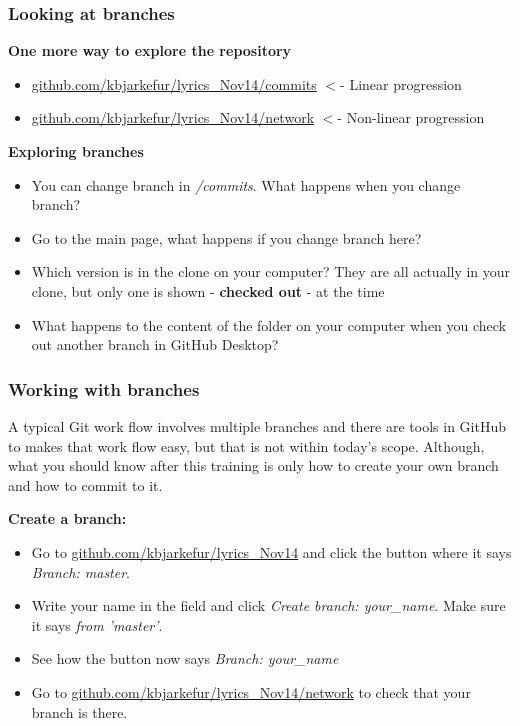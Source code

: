 \documentclass[aspectratio=169]{beamer} %
\newcommand{\trainingURL}[1]{{\color{blue}\url{#1}}}
\newcommand{\traininerUsername}{kbjarkefur}
\newcommand{\repoName}{\traininerUsername/lyrics\_Nov14}
\newcommand{\trainingRepoURL}[1]{\trainingURL{github.com/\repoName #1}}
\begin{document}
\begin{frame}
\frametitle{Looking at branches}


	\textbf{One more way to explore the repository}
	\begin{itemize}
		\item \trainingRepoURL{/commits} $<$- Linear progression
		\item \trainingRepoURL{/network} $<$- Non-linear progression
	\end{itemize}

	\vspace{.1cm}
	
	\textbf{Exploring branches}
	\begin{itemize}
		\item You can change branch in \textit{/commits}. What happens when you change branch?
		\item Go to the main page, what happens if you change branch here?
		\item Which version is in the clone on your computer? They are all actually in your clone, but only one is shown - \textbf{checked out} - at the time
		\item What happens to the content of the folder on your computer when you check out another branch in GitHub Desktop?
	\end{itemize}

\end{frame}

\begin{frame}
\frametitle{Working with branches}

	A typical Git work flow involves multiple branches and there are tools in GitHub to makes that work flow easy, but that is not within today's scope. Although, what you should know after this training is only how to create your own branch and how to commit to it. 
	
	\textbf{Create a branch:}
	\begin{itemize}
		\item Go to \trainingRepoURL{} and click the button where it says \textit{Branch: master}.
		\item Write your name in the field and click \textit{Create branch: your\_name}. Make sure it says \textit{from 'master'}.
		\item See how the button now says \textit{Branch: your\_name}
		\item Go to \trainingRepoURL{/network} to check that your branch is there.
	\end{itemize}	

\end{frame}
\end{document}
